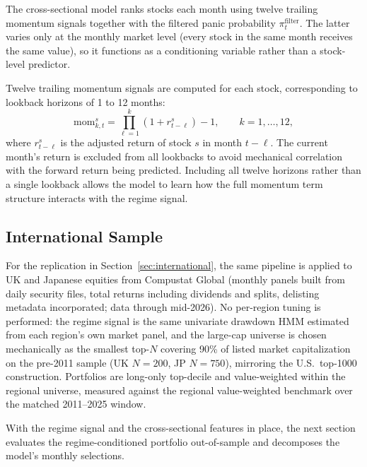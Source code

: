The cross-sectional model ranks stocks each month using twelve trailing momentum signals together with the filtered panic probability $\pi_t^{\text{filter}}$. The latter varies only at the monthly market level (every stock in the same month receives the same value), so it functions as a conditioning variable rather than a stock-level predictor.

Twelve trailing momentum signals are computed for each stock, corresponding to lookback horizons of 1 to 12 months:
\begin{equation}
    \text{mom}_{k,t}^s = \prod_{\ell=1}^{k}(1 + r_{t-\ell}^s) - 1, \qquad k = 1, \dots, 12,
\end{equation}
where $r_{t-\ell}^s$ is the adjusted return of stock $s$ in month $t - \ell$. The current month's return is excluded from all lookbacks to avoid mechanical correlation with the forward return being predicted. Including all twelve horizons rather than a single lookback allows the model to learn how the full momentum term structure interacts with the regime signal.

\subsection{International Sample}\label{sec:intl_sample}

For the replication in Section~\ref{sec:international}, the same pipeline is applied to UK and Japanese equities from Compustat Global (monthly panels built from daily security files, total returns including dividends and splits, delisting metadata incorporated; data through mid-2026). No per-region tuning is performed: the regime signal is the same univariate drawdown HMM estimated from each region's own market panel, and the large-cap universe is chosen mechanically as the smallest top-$N$ covering 90\% of listed market capitalization on the pre-2011 sample (UK $N = 200$, JP $N = 750$), mirroring the U.S.\ top-1000 construction. Portfolios are long-only top-decile and value-weighted within the regional universe, measured against the regional value-weighted benchmark over the matched 2011--2025 window.

With the regime signal and the cross-sectional features in place, the next section evaluates the regime-conditioned portfolio out-of-sample and decomposes the model's monthly selections.
